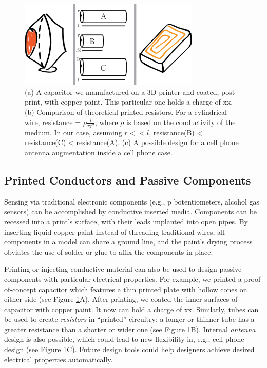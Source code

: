 \begin{figure}[h]
\centering
    \includegraphics[width=3.4in]{figures/electronics.png}
\caption{(a) A capacitor we manufactured on a 3D printer and coated, post-print, with copper paint.  This particular one holds a charge of xx.  (b) Comparison of theoretical printed resistors.  For a cylindrical wire, resistance = $\rho\frac{l}{\pi r^2}$, where $\rho$ is based on the conductivity of the medium.  In our case, assuming $ r << l$, resistance(B) < resistance(C) < resistance(A).  (c) A possible design for a cell phone antenna augmentation inside a cell phone case. }
\label{fig:electronics}
\end{figure}

\subsection{Printed Conductors and Passive Components}

Sensing via traditional electronic components (e.g., p botentiometers, alcohol gas sensors) can be accomplished by conductive inserted media.  Components can be recessed into a print's surface, with their leads implanted into open pipes.   By inserting liquid copper paint instead of threading traditional wires, all components in a model can share a ground line, and the paint's drying process obviates the use of solder or glue to affix the components in place.

Printing or injecting conductive material can also be used to design passive components with particular electrical properties. For example, we printed a proof-of-concept  capacitor which features a thin printed plate with hollow cones on either side (see Figure \ref{fig:electronics}A).  After printing, we coated the inner surfaces of capacitor with copper paint.  It now can hold a charge of xx.  Similarly, tubes can be used to create \emph{resistors} in ``printed'' circuitry: a longer or thinner tube has a greater resistance than a shorter or wider one (see Figure \ref{fig:electronics}B).  Internal \emph{antenna} design is also possible, which could lead to new flexibility in, e.g., cell phone design (see Figure \ref{fig:electronics}C). Future design tools could help designers achieve desired electrical properties automatically.

